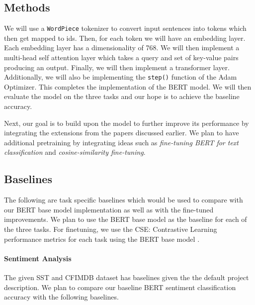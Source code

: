 \documentclass{article}
\begin{document}
\subsection{Methods}

We will use a \texttt{WordPiece} tokenizer to convert input sentences into tokens which then get mapped to ids. Then, for each token we will have an embedding layer. Each embedding layer has a dimensionality of 768. We will then implement a multi-head self attention layer which takes a query and set of key-value pairs producing an output. Finally, we will then implement a transformer layer. Additionally, we will also be implementing the \texttt{step()} function of the Adam Optimizer. This completes the implementation of the BERT model. We will then evaluate the model on the three tasks and our hope is to achieve the baseline accuracy.

Next, our goal is to build upon the model to further improve its performance by integrating the extensions from the papers discussed earlier. We plan to have additional pretraining by integrating ideas such as \textit{fine-tuning BERT for text classification} and \textit{cosine-similarity fine-tuning}.

\subsection{Baselines}
The following are task specific baselines which would be used to compare with our BERT base model implementation as well as with the fine-tuned improvements. We plan to use the BERT base model as the baseline for each of the three tasks.\cite{bert} For finetuning, we use the CSE: Contrastive Learning performance metrics for each task using the BERT base model \cite{simcse}. 

\paragraph{Sentiment Analysis}
The given SST and CFIMDB dataset has baselines given the the default project description. We plan to compare our baseline BERT sentiment classification accuracy with the following baselines.
\end{document}
